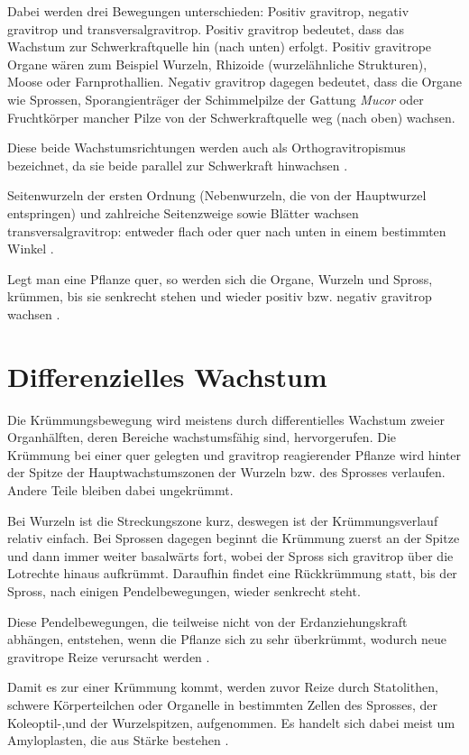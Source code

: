\documentclass[
a4paper, 
11pt, 
ngerman,
listof=totoc,
bibliography=totocnumbered,
abstracton
]{scrreprt}
\begin{document}
Dabei werden drei Bewegungen unterschieden: Positiv gravitrop, negativ gravitrop und transversalgravitrop.
Positiv gravitrop bedeutet, dass das Wachstum zur Schwerkraftquelle hin (nach unten) erfolgt.
Positiv gravitrope Organe wären zum Beispiel Wurzeln, Rhizoide (wurzelähnliche Strukturen), Moose oder Farnprothallien.
Negativ gravitrop dagegen bedeutet, dass die Organe wie Sprossen, Sporangienträger der Schimmelpilze der Gattung \emph{Mucor} oder Fruchtkörper mancher Pilze von der Schwerkraftquelle weg (nach oben) wachsen.

Diese beide Wachstumsrichtungen werden auch als Orthogravitropismus bezeichnet, da sie beide parallel zur Schwerkraft hinwachsen \parencite[546]{Jacob}.

Seitenwurzeln der ersten Ordnung (Nebenwurzeln, die von der Hauptwurzel entspringen) und zahlreiche Seitenzweige sowie Blätter wachsen transversalgravitrop: entweder flach oder quer nach unten in einem bestimmten Winkel \parencite[449]{Strasburger}. 

Legt man eine Pflanze quer, so werden sich die Organe, Wurzeln und Spross, krümmen, bis sie senkrecht stehen und wieder positiv bzw. negativ gravitrop wachsen
\parencite[528]{Luettge}.

\section{Differenzielles Wachstum}

Die Krümmungsbewegung wird meistens durch differentielles Wachstum zweier Organhälften, deren Bereiche wachstumsfähig sind, hervorgerufen.
Die Krümmung bei einer quer gelegten und gravitrop reagierender Pflanze wird hinter der Spitze der Hauptwachstumszonen der Wurzeln bzw. des Sprosses verlaufen. Andere Teile bleiben dabei ungekrümmt.

Bei Wurzeln ist die Streckungszone kurz, deswegen ist der Krümmungsverlauf relativ einfach. Bei Sprossen dagegen beginnt die Krümmung zuerst an der Spitze und dann immer weiter basalwärts fort, wobei der Spross sich gravitrop über die Lotrechte hinaus aufkrümmt.
Daraufhin findet eine Rückkrümmung statt, bis der Spross, nach einigen Pendelbewegungen, wieder senkrecht steht.

Diese Pendelbewegungen, die teilweise nicht von der Erdanziehungskraft abhängen, entstehen, wenn die Pflanze sich zu sehr überkrümmt, wodurch neue gravitrope Reize verursacht werden \parencite[450f]{Strasburger}.

Damit es zur einer Krümmung kommt, werden zuvor Reize durch Statolithen, schwere Körperteilchen oder Organelle in bestimmten Zellen des Sprosses, der Koleoptil-,und der Wurzelspitzen, aufgenommen. Es handelt sich dabei meist um Amyloplasten, die aus Stärke bestehen \parencite[530]{Luettge}.
\end{document}
